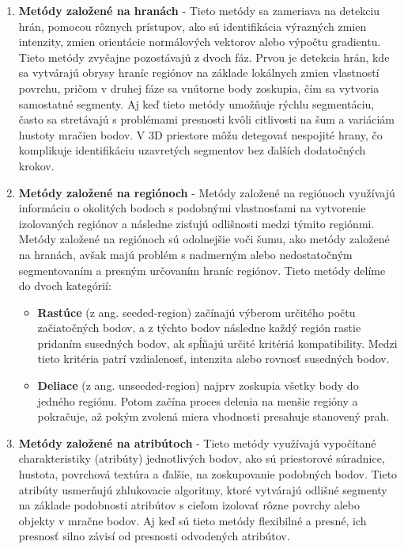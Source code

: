 \begin{enumerate} 
 \item\textbf{Metódy založené na hranách} - Tieto metódy sa zameriava na detekciu hrán, pomocou rôznych prístupov, ako sú identifikácia výrazných zmien intenzity, zmien orientácie normálových vektorov alebo výpočtu gradientu. Tieto metódy zvyčajne pozostávajú z dvoch fáz. Prvou je detekcia hrán, kde sa vytvárajú obrysy hraníc regiónov na základe lokálnych zmien vlastností povrchu, pričom v druhej fáze sa vnútorne body zoskupia, čím sa vytvoria samostatné segmenty. Aj keď tieto metódy umožňuje rýchlu segmentáciu, často sa stretávajú s problémami presnosti kvôli citlivosti na šum a variáciám hustoty mračien bodov. V 3D priestore môžu detegovať nespojité hrany, čo komplikuje identifikáciu uzavretých segmentov bez ďalších dodatočných krokov. \cite{segmetation_survey} 
 \item\textbf{Metódy založené na regiónoch} - Metódy založené na regiónoch využívajú informáciu o okolitých bodoch s podobnými vlastnosťami na vytvorenie izolovaných regiónov a následne zisťujú odlišnosti medzi týmito regiónmi. Metódy založené na regiónoch sú odolnejšie voči šumu, ako metódy založené na hranách, avšak majú problém s nadmerným alebo nedostatočným segmentovaním a presným určovaním hraníc regiónov. Tieto metódy delíme do dvoch kategórií:  \cite{segmetation_survey} 
 \begin{itemize}
    \item\textbf{Rastúce} (z ang. seeded-region) začínajú výberom určitého počtu začiatočných bodov, a z týchto bodov následne každý región rastie pridaním susedných bodov, ak spĺňajú určité kritériá kompatibility. Medzi tieto kritéria patrí vzdialenosť, intenzita alebo rovnosť susedných bodov. \cite{segmetation_survey}  
    \item\textbf{Deliace} (z ang. unseeded-region) najprv zoskupia všetky body do jedného regiónu. Potom začína proces delenia na menšie regióny a pokračuje, až pokým zvolená miera vhodnosti presahuje stanovený prah. \cite{segmetation_survey}
 \end{itemize}
 \item\textbf{Metódy založené na atribútoch} - Tieto metódy využívajú vypočítané charakteristiky (atribúty) jednotlivých bodov, ako sú priestorové súradnice, hustota, povrchová textúra a ďalšie, na zoskupovanie podobných bodov. Tieto atribúty usmerňujú zhlukovacie algoritmy, ktoré vytvárajú odlišné segmenty na základe podobnosti atribútov s cieľom izolovať rôzne povrchy alebo objekty v mračne bodov. Aj keď sú tieto metódy flexibilné a presné, ich presnosť silno závisí od presnosti odvodených atribútov.

\end{enumerate}

